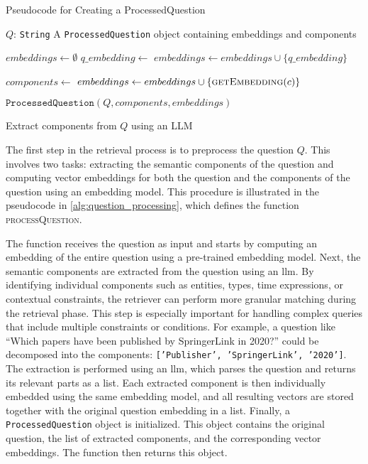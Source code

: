 \begin{algorithm}[t]
\caption{Pseudocode for Creating a ProcessedQuestion}
\label{alg:question_processing}
\begin{algorithmic}[1]
    \Require 
        \Statex $Q$: \texttt{String} 
    \Ensure
        \Statex A \texttt{ProcessedQuestion} object containing embeddings and components

        \State $embeddings \gets \emptyset$
        \State $q\_embedding \gets$  
        \State $embeddings \gets embeddings \cup \{q\_embedding\}$

        \State $components \gets$ 
            \State $embeddings \gets embeddings \cup \{\Call{getEmbedding}{c}\}$
        \EndFor

        \State \Return $\texttt{ProcessedQuestion}(Q, components, embeddings)$
    \EndFunction

    \Statex
        \State \Return Extract components from $Q$ using an LLM
    \EndFunction
\end{algorithmic}
\end{algorithm}

The first step in the retrieval process is to preprocess the question \(Q\). This involves two tasks: extracting the semantic components of the question and computing vector embeddings for both the question and the components of the question using an embedding model. This procedure is illustrated in the pseudocode in \autoref{alg:question_processing}, which defines the function \textsc{processQuestion}. 

The function receives the question as input and starts by computing an embedding of the entire question using a pre-trained embedding model. Next, the semantic components are extracted from the question using an \gls{llm}. By identifying individual components such as entities, types, time expressions, or contextual constraints, the retriever can perform more granular matching during the retrieval phase. This step is especially important for handling complex queries that include multiple constraints or conditions. For example, a question like \enquote{Which papers have been published by SpringerLink in 2020?} could be decomposed into the components: \texttt{['Publisher', 'SpringerLink', '2020']}. The extraction is performed using an \gls{llm}, which parses the question and returns its relevant parts as a list. Each extracted component is then individually embedded using the same embedding model, and all resulting vectors are stored together with the original question embedding in a list. Finally, a \texttt{ProcessedQuestion} object is initialized. This object contains the original question, the list of extracted components, and the corresponding vector embeddings. The function then returns this object.   


